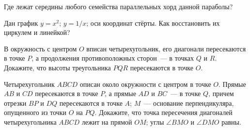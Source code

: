\documentclass[a4paper,12pt]{article}
\begin{document}
 Где лежат середины любого семейства параллельных хорд данной
параболы? 

 Дан график   $y = x^2$;  $y = 1/x$; оси
координат стёрты. Как  восстановить их циркулем и линейкой? 

 В окружность с центром $O$ вписан четырехугольник, его
диагонали пересекаются в точке $P$, а продолжения противоположных
сторон~--- в точках $Q$ и $R$. Докажите, что высоты треугольника
$PQR$ пересекаются в точке $O$. 

 Четырехугольник $ABCD$ описан около окружности с центром в
точке $O$. Прямые $AB$ и $CD$ пересекаются в точке $P$, а прямые
$AD$ и $BC$~--- в точке $Q$, причем отрезки $BP$ и $DQ$ пересекаются
в точке $A$; $M$~--- основание перпендикуляра, опущенного из точки
$O$ на $PQ$. Докажите, что   точка пересечения
диагоналей четырехугольника $ABCD$ лежит на прямой $OM$; 
углы $\angle BMO$ и $\angle DMO$ равны. 

\vfill
{}
\end{document}
